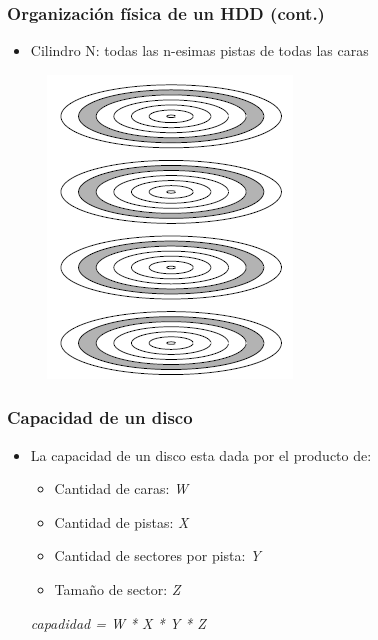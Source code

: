 \begin{frame}
  \frametitle{Organización física de un \textbf{HDD} (cont.)}
  \begin{itemize}
  	\item Cilindro N: todas las n-esimas pistas de todas las caras
  \end{itemize}
  \begin{figure}
    \includegraphics[scale=0.4]{images/cylinders.png}
  \end{figure}
\end{frame}

\begin{frame}
  \frametitle{Capacidad de un disco}
  \begin{itemize}
  	\item La capacidad de un disco esta dada por el producto de:
  	\begin{itemize}
  		\item Cantidad de caras: \emph{W}
  		\item Cantidad de pistas: \emph{X}
  		\item Cantidad de sectores por pista: \emph{Y}
  		\item Tamaño de sector: \emph{Z}
  	\end{itemize}

  	\emph{capadidad = W * X * Y * Z}
  \end{itemize}
\end{frame}

